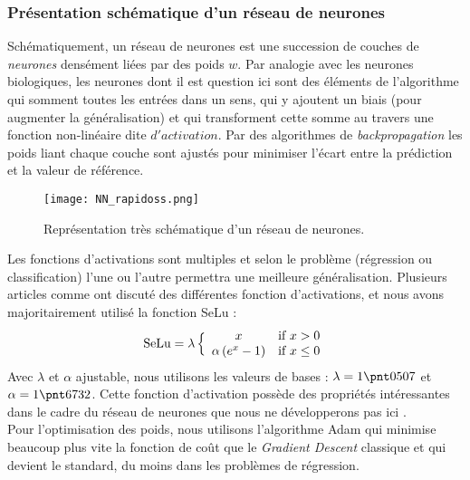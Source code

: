 \documentclass[a4paper,12pt]{article}
\newcommand{\bepar}[1]{
	\left( #1 \right)  
}
\newcommand\bk{\color{black}}
\newcommand\dsb{\color{dsb}}
\numberwithin{equation}{section} %
\begin{document}
\dsb\subsubsection{Présentation schématique d'un réseau de neurones} \bk
\noindent Schématiquement, un réseau de neurones est une succession de couches de \textit{neurones} densément liées par des poids $w$. Par analogie avec les neurones biologiques, les neurones dont il est question ici sont des éléments de l'algorithme qui somment toutes les entrées dans un sens, qui y ajoutent un biais (pour augmenter la généralisation) et qui transforment cette somme au travers une fonction non-linéaire dite $d'activation$. Par des algorithmes de \textit{backpropagation} les poids liant chaque couche sont ajustés pour minimiser l'écart entre la prédiction et la valeur de référence.
\begin{figure}[!ht]
\centering
\texttt{[image: NN\_rapidoss.png]}
\caption{\small{Représentation très schématique d'un réseau de neurones.}}
\label{NN_skeme}
\end{figure}
Les fonctions d'activations sont multiples et selon le problème (régression ou classification) l'une ou l'autre permettra une meilleure généralisation. Plusieurs articles comme \citep{krizhevsky2010convolutional} ont discuté des différentes fonction d'activations, et nous avons majoritairement utilisé la fonction SeLu :
\begin{equation}
\text{SeLu} = \lambda \,
\Big \{
		\begin{array}{c l}
		x & \text{if } x > 0 \\
		\alpha \bepar{ e^x - 1} & \text{if } x \leq 0
		\end{array}						
\end{equation}
Avec $\lambda$ et $\alpha$ ajustable, nous utilisons les valeurs de bases : $\lambda = 1\pnt 0507$ et $\alpha = 1 \pnt 6732$. Cette fonction d'activation possède des propriétés intéressantes dans le cadre du réseau de neurones que nous ne développerons pas ici \citep{klambauer2017self}.\\
Pour l'optimisation des poids, nous utilisons l'algorithme Adam \citep{kingma2014adam} qui minimise beaucoup plus vite la fonction de coût que le \textit{Gradient Descent} classique et qui devient le standard, du moins dans les problèmes de régression.\\
\end{document}
